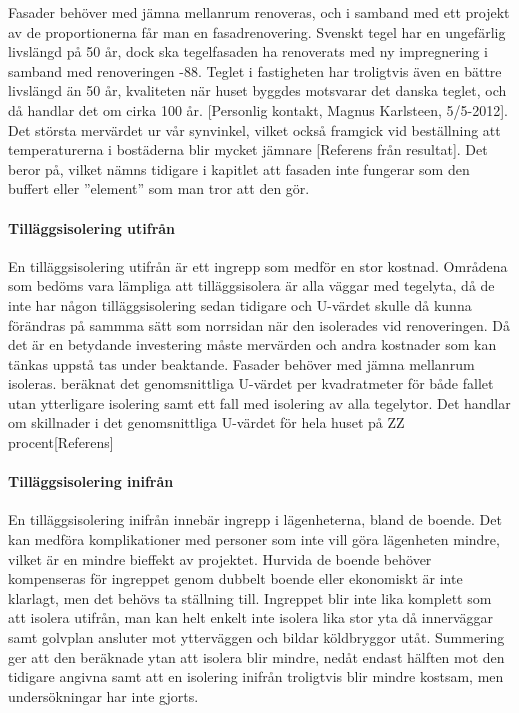 Fasader behöver med jämna mellanrum renoveras, och i samband med ett projekt av de proportionerna får man en fasadrenovering. Svenskt tegel har en ungefärlig livslängd på 50 år, dock ska tegelfasaden ha renoverats med ny impregnering i samband med renoveringen -88. Teglet i fastigheten har troligtvis även en bättre livslängd än 50 år, kvaliteten när huset byggdes motsvarar det danska teglet, och då handlar det om cirka 100 år. [Personlig kontakt, Magnus Karlsteen, 5/5-2012]. Det största mervärdet ur vår synvinkel, vilket också framgick vid beställning att temperaturerna i bostäderna blir mycket jämnare [Referens från resultat]. Det beror på, vilket nämns tidigare i kapitlet att fasaden inte fungerar som den buffert eller ”element” som man tror att den gör.

\paragraph{Tilläggsisolering utifrån}
En tilläggsisolering utifrån är ett ingrepp som medför en stor kostnad. Områdena som bedöms vara lämpliga att tilläggsisolera är alla väggar med tegelyta, då de inte har någon tilläggsisolering sedan tidigare och U-värdet skulle då kunna förändras på sammma sätt som norrsidan när den isolerades vid renoveringen. Då det är en betydande investering måste mervärden och andra kostnader som kan tänkas uppstå tas under beaktande. Fasader behöver med jämna mellanrum isoleras. beräknat det genomsnittliga U-värdet per kvadratmeter för både fallet utan ytterligare isolering samt ett fall med isolering av alla tegelytor. Det handlar om skillnader i det genomsnittliga U-värdet för hela huset på ZZ procent[Referens]

\paragraph{Tilläggsisolering inifrån}
En tilläggsisolering inifrån innebär ingrepp i lägenheterna, bland de boende. Det kan medföra komplikationer med personer som inte vill göra lägenheten mindre, vilket är en mindre bieffekt av projektet. Hurvida de boende behöver kompenseras för ingreppet genom dubbelt boende eller ekonomiskt är inte klarlagt, men det behövs ta ställning till. Ingreppet blir inte lika komplett som att isolera utifrån, man kan helt enkelt inte isolera lika stor yta då innerväggar samt golvplan ansluter mot ytterväggen och bildar köldbryggor utåt. Summering ger att den beräknade ytan att isolera blir mindre, nedåt endast hälften mot den tidigare angivna samt att en isolering inifrån troligtvis blir mindre kostsam, men undersökningar har inte gjorts.


